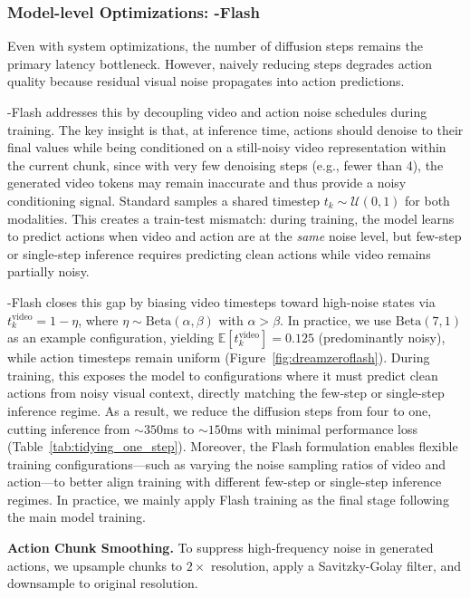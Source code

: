 \subsubsection{Model-level Optimizations: \ourmethod-Flash}
\label{subsec:dreamzeroflash}



Even with system optimizations, the number of diffusion steps remains the primary latency bottleneck. However, naively reducing steps degrades action quality because residual visual noise propagates into action predictions.

\ourmethod-Flash addresses this by decoupling video and action noise schedules during training. 
The key insight is that, at inference time, actions should denoise to their final values while being conditioned on a still-noisy video representation within the current chunk, since with very few denoising steps (e.g., fewer than 4), the generated video tokens may remain inaccurate and thus provide a noisy conditioning signal.
Standard \ourmethod samples a shared timestep $t_k \sim \mathcal{U}(0,1)$ for both modalities. This creates a train-test mismatch: during training, the model learns to predict actions when video and action are at the \textit{same} noise level, but few-step or single-step inference requires predicting clean actions while video remains partially noisy.

\ourmethod-Flash closes this gap by biasing video timesteps toward high-noise states via $t_k^{\text{video}} = 1 - \eta$, where $\eta \sim \text{Beta}(\alpha, \beta)$ with $\alpha > \beta$.
In practice, we use $\text{Beta}(7, 1)$ as an example configuration, yielding $\mathbb{E}[t_k^{\text{video}}] = 0.125$ (predominantly noisy), while action timesteps remain uniform (Figure~\ref{fig:dreamzeroflash}). During training, this exposes the model to configurations where it must predict clean actions from noisy visual context, directly matching the few-step or single-step inference regime. As a result, we reduce the diffusion steps from four to one, cutting inference from ${\sim}350$ms to ${\sim}150$ms with minimal performance loss (Table~\ref{tab:tidying_one_step}). Moreover, the Flash formulation enables flexible training configurations—such as varying the noise sampling ratios of video and action—to better align training with different few-step or single-step inference regimes. In practice, we mainly apply Flash training as the final stage following the main \ourmethod model training.

\textbf{Action Chunk Smoothing.} To suppress high-frequency noise in generated actions, we upsample chunks to $2\times$ resolution, apply a Savitzky-Golay filter, and downsample to original resolution.

